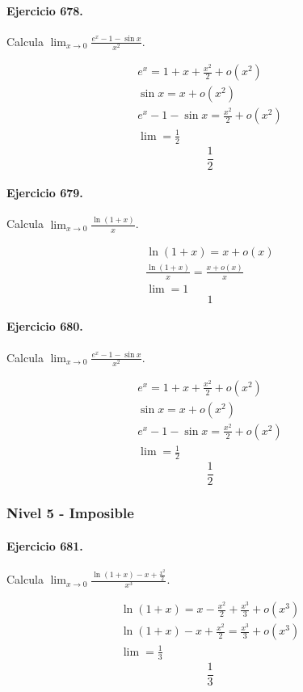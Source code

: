 \documentclass[11pt,a4paper]{article}
\begin{document}
\paragraph{Ejercicio 678.} Calcula $\displaystyle\lim_{x\to0}\frac{e^x-1-\sin x}{x^2}$.

\[
\begin{aligned}
e^x=1+x+\frac{x^2}{2}+o(x^2)\\
\sin x=x+o(x^2)\\
e^x-1-\sin x=\frac{x^2}{2}+o(x^2)\\
\lim=\frac12
\end{aligned}
\]
\[\boxed{\frac12}\]


\paragraph{Ejercicio 679.} Calcula $\displaystyle\lim_{x\to0}\frac{\ln(1+x)}{x}$.

\[
\begin{aligned}
\ln(1+x)=x+o(x)\\
\frac{\ln(1+x)}{x}=\frac{x+o(x)}{x}\\
\lim=1
\end{aligned}
\]
\[\boxed{1}\]


\paragraph{Ejercicio 680.} Calcula $\displaystyle\lim_{x\to0}\frac{e^x-1-\sin x}{x^2}$.

\[
\begin{aligned}
e^x=1+x+\frac{x^2}{2}+o(x^2)\\
\sin x=x+o(x^2)\\
e^x-1-\sin x=\frac{x^2}{2}+o(x^2)\\
\lim=\frac12
\end{aligned}
\]
\[\boxed{\frac12}\]


\newpage

\subsubsection*{Nivel 5 - Imposible}

\paragraph{Ejercicio 681.} Calcula $\displaystyle \lim_{x\to0}\frac{\ln(1+x)-x+\frac{x^2}{2}}{x^3}$.

\[
\begin{aligned}
\ln(1+x)=x-\frac{x^2}{2}+\frac{x^3}{3}+o(x^3)\\
\ln(1+x)-x+\frac{x^2}{2}=\frac{x^3}{3}+o(x^3)\\
\lim=\frac13
\end{aligned}
\]
\[\boxed{\frac13}\]
\end{document}
